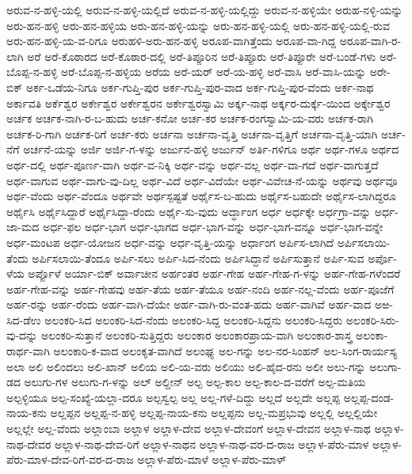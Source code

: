 ಅರುವ-ನ-ಹಳ್ಳಿ-ಯಲ್ಲಿ
ಅರುವ-ನ-ಹಳ್ಳಿ-ಯಲ್ಲಿದೆ
ಅರುವ-ನ-ಹಳ್ಳಿ-ಯಲ್ಲಿದ್ದು
ಅರುವ-ನ-ಹಳ್ಳಿಯೇ
ಅರುಹ-ನಳ್ಳಿ-ಯನ್ನು
ಅರು-ಹನ-ಹಳ್ಳಿ
ಅರು-ಹನ-ಹಳ್ಳಿಯ
ಅರು-ಹನ-ಹಳ್ಳಿ-ಯನ್ನು
ಅರು-ಹನ-ಹಳ್ಳಿ-ಯಲ್ಲಿ
ಅರು-ಹನ-ಹಳ್ಳಿ-ಯಲ್ಲಿ-ರುವ
ಅರು-ಹನ-ಹಳ್ಳಿ-ಯ-ವ-ರಿಗೂ
ಅರುಹಳಿ-ಅರು-ಹನ-ಹಳ್ಳಿ
ಅರೂಪ-ವಾಗಿತ್ತೆಂದು
ಅರೂಪ-ವಾ-ಗಿದ್ದ
ಅರೂಪ-ವಾಗಿ-ರ-ಲಾಗಿ
ಅರೆ
ಅರೆ-ಕೊಠಾರದ
ಅರೆ-ಕೊಠಾರ-ದಲ್ಲಿ
ಅರೆ-ತಿಪ್ಪೂರಿನ
ಅರೆ-ತಿಪ್ಪೂರು
ಅರೆ-ತಿಪ್ಪೂರೇ
ಅರೆ-ಬಂಡೆ-ಗಳು
ಅರೆ-ಬೊಪ್ಪ-ನ-ಹಳ್ಳಿ
ಅರೆ-ಬೊಪ್ಪ-ನ-ಹಳ್ಳಿಯ
ಅರೆಯ
ಅರೆ-ಯರ್
ಅರೆ-ಯ-ಹಳ್ಳಿ
ಅರೆ-ವಾಸಿ
ಅರೆ-ವಾಸಿ-ಯನ್ನು
ಅರೇ-ಬಿಕ್
ಅರ್ಕ-ಒಡೆಯ-ನಿಗೂ
ಅರ್ಕ-ಗುಪ್ತಿ-ಪುರ
ಅರ್ಕ-ಗುಪ್ತಿ-ಪುರ-ವಾದ
ಅರ್ಕ-ಗುಪ್ತಿ-ಪುರ-ವೆಂದು
ಅರ್ಕ-ನಾಥ
ಅರ್ಕಾವತಿ
ಅರ್ಕೆಶ್ವರ
ಅರ್ಕೇಶ್ವರ
ಅರ್ಕೇಶ್ವರನ
ಅರ್ಕೇಶ್ವರಸ್ವಾಮಿ
ಅರ್ಕ್ಕ-ನಾಥ
ಅರ್ಕ್ಕರ-ದುರ್ಕ್ಕೆ-ಯಿಂದ
ಅರ್ಕ್ಕೇಶ್ವರ
ಅರ್ಚಕ
ಅರ್ಚಕ-ನಾಗಿ-ರ-ಬ-ಹುದು
ಅರ್ಚ-ಕನೋ
ಅರ್ಚ-ಕರ
ಅರ್ಚಕ-ರಂಗಸ್ವಾಮಿ-ಯ-ವರು
ಅರ್ಚಕ-ರಾಗಿ
ಅರ್ಚಕ-ರಿ-ಗಾಗಿ
ಅರ್ಚಕ-ರಿಗೆ
ಅರ್ಚ-ಕರು
ಅರ್ಚನಾ
ಅರ್ಚನಾ-ವೃತ್ತಿ
ಅರ್ಚನಾ-ವೃತ್ತಿಗೆ
ಅರ್ಚನಾ-ವೃತ್ತಿ-ಯಾಗಿ
ಅರ್ಚ-ನೆಗೆ
ಅರ್ಚನೆ-ಯನ್ನು
ಅರ್ಜಿ
ಅರ್ಜಿ-ಗ-ಳನ್ನು
ಅರ್ಜುನ-ಹಳ್ಳಿ
ಅರ್ಜುನ್
ಅರ್ತಿ-ಗಳಿಗೂ
ಅರ್ಥ
ಅರ್ಥ-ಗಳೂ
ಅರ್ಥದ
ಅರ್ಥ-ದಲ್ಲಿ
ಅರ್ಥ-ಪೂರ್ಣ-ವಾಗಿ
ಅರ್ಥ-ವ-ನಿಕ್ಕಿ
ಅರ್ಥ-ವನ್ನು
ಅರ್ಥ-ವಲ್ಲ
ಅರ್ಥ-ವಾ-ಗದೆ
ಅರ್ಥ-ವಾಗುತ್ತದೆ
ಅರ್ಥ-ವಾಗುವ
ಅರ್ಥ-ವಾಗು-ವು-ದಿಲ್ಲ
ಅರ್ಥ-ವಿದೆ
ಅರ್ಥ-ವಿದೆಯೇ
ಅರ್ಥ-ವಿವೇಚ-ನೆ-ಯನ್ನು
ಅರ್ಥವು
ಅರ್ಥವೂ
ಅರ್ಥ-ವೆಂದು
ಅರ್ಥ-ವೆಂದೂ
ಅರ್ಥವೇ
ಅರ್ಥಸ್ಪಷ್ಟತೆ
ಅರ್ಥೈಸ-ಬ-ಹುದು
ಅರ್ಥೈಸ-ಬಹುದೇ
ಅರ್ಥೈಸ-ಲಾಗಿದ್ದರೂ
ಅರ್ಥೈಸಿ
ಅರ್ಥೈಸಿದ್ದಾರೆ
ಅರ್ಥೈಸಿದ್ದಾ-ರೆಂದು
ಅರ್ಥೈ-ಸು-ವುದು
ಅರ್ದ್ಧಾಂಗ
ಅರ್ಧ
ಅರ್ಧಕ್ಕೇ
ಅರ್ಧಗ್ರಾ-ವನ್ನು
ಅರ್ಧ-ಜಾ-ಮದ
ಅರ್ಧ-ಫಲ
ಅರ್ಧ-ಭಾಗ
ಅರ್ಧ-ಭಾಗದ
ಅರ್ಧ-ಭಾಗ-ವನ್ನು
ಅರ್ಧ-ಭಾಗ-ವನ್ನೂ
ಅರ್ಧ-ಭಾಗ-ವನ್ನೇ
ಅರ್ಧ-ಮಂಟಪ
ಅರ್ಧ-ಯೋಜನ
ಅರ್ಧ-ವನ್ನು
ಅರ್ಧ-ವೃತ್ತಿ-ಯನ್ನು
ಅರ್ಧಾಂಗ
ಅರ್ಪಿಸ-ಲಾಗಿದೆ
ಅರ್ಪಿಸಲಾಯಿ-ತೆಂದು
ಅರ್ಪಿಸಲಾಯಿ-ತೆಂದೂ
ಅರ್ಪಿ-ಸಲು
ಅರ್ಪಿ-ಸಿದ-ನೆಂದು
ಅರ್ಪಿಸಿದ್ದಾನೆ
ಅರ್ಪಿಸುತ್ತಾನೆ
ಅರ್ಪಿ-ಸುವ
ಅರ್ಪೊ-ಳೆಯ
ಅರ್ಪ್ಪೊಳೆ
ಅರ್ಯಾ-ಬಿಕ್
ಅರ್ವಾಚೀನ
ಅರ್ಹಂತರ
ಅರ್ಹ-ಗೇಹ
ಅರ್ಹ-ಗೇಹ-ಗ-ಳನ್ನು
ಅರ್ಹ-ಗೇಹ-ಗಳೆಂದರೆ
ಅರ್ಹ-ಗೇಹ-ವನ್ನು
ಅರ್ಹ-ಗೇಹವು
ಅರ್ಹ-ತೆಯ
ಅರ್ಹ-ತೆಯೂ
ಅರ್ಹ-ನಂದಿ
ಅರ್ಹ-ನಲ್ಲ-ವೆಂದು
ಅರ್ಹ-ಪೂಜೆಗೆ
ಅರ್ಹ-ರನ್ನು
ಅರ್ಹ-ರೆಂದು
ಅರ್ಹ-ವಾಗಿ-ದೆಯೇ
ಅರ್ಹ-ವಾಗಿ-ರು-ವಂತ-ಹದು
ಅರ್ಹ-ವಾಗಿವೆ
ಅರ್ಹ-ವಾದ
ಅಱ-ಸಿದ-ಡೆಉ
ಅಲಂಕರಿ-ಸಿದ
ಅಲಂಕರಿ-ಸಿದ-ನೆಂದು
ಅಲಂಕರಿ-ಸಿದ್ದ
ಅಲಂಕರಿ-ಸಿದ್ದನು
ಅಲಂಕರಿ-ಸಿದ್ದರು
ಅಲಂಕರಿ-ಸಿರು-ವು-ದನ್ನು
ಅಲಂಕರಿ-ಸುತ್ತಾನೆ
ಅಲಂಕರಿ-ಸುತ್ತಿದ್ದರು
ಅಲಂಕಾರ
ಅಲಂಕಾರಪ್ರಾಯ-ವಾಗಿ
ಅಲಂಕಾರ-ಶಾಸ್ತ್ರ
ಅಲಂಕಾ-ರಾರ್ಥ-ವಾಗಿ
ಅಲಂಕಾರಿ-ಕ-ವಾದ
ಅಲಂಕೃತ-ವಾಗಿದೆ
ಅಲಂಘ್ಯ
ಅಲ-ಗನ್ನು
ಅಲ-ನರ-ಸಿಂಹನ್
ಅಲ-ಸಿಂಗ-ರಾರ್ಯಸ್ಯ
ಅಲಾ
ಅಲಿ
ಅಲಿಂದಲು
ಅಲಿ-ಖಾನ್
ಅಲಿಯ
ಅಲಿ-ಯ-ವರು
ಅಲಿಯು
ಅಲಿ-ಹೈದ-ರನು
ಅಲೀ
ಅಲು-ಗನ್ನು
ಅಲುಗಾ-ಡದ
ಅಲುಗು-ಗಳ
ಅಲುಗು-ಗ-ಳನ್ನು
ಅಲ್
ಅಲ್ದೀನ್
ಅಲ್ಪ
ಅಲ್ಪ-ಕಾಲ
ಅಲ್ಪ-ಕಾಲ-ದ-ವರೆಗೆ
ಅಲ್ಪ-ಮತಿಯ
ಅಲ್ಪಳ್ಳಿಯೂ
ಅಲ್ಪ-ಸಂಖ್ಯೆ-ಯಲ್ಲಾ-ದರೂ
ಅಲ್ಪಸ್ವಲ್ಪ
ಅಲ್ಲ
ಅಲ್ಲ-ಗಳೆ-ದಿದ್ದು
ಅಲ್ಲದೆ
ಅಲ್ಲದೇ
ಅಲ್ಲಪ್ಪ
ಅಲ್ಲಪ್ಪ-ದಂಡ-ನಾಯ-ಕನು
ಅಲ್ಲಪ್ಪನ
ಅಲ್ಲಪ್ಪ-ನ-ಹಳ್ಳಿ
ಅಲ್ಲಪ್ಪ-ನಾಯ-ಕನು
ಅಲ್ಲಪ್ಪನು
ಅಲ್ಲ-ಮಪ್ರಭುವು
ಅಲ್ಲಲ್ಲಿ
ಅಲ್ಲಲ್ಲಿಯೇ
ಅಲ್ಲಲ್ಲೇ
ಅಲ್ಲ-ವೆಂದು
ಅಲ್ಲಾಂಬಾ
ಅಲ್ಲಾಳ
ಅಲ್ಲಾಳ-ದೇವ
ಅಲ್ಲಾಳ-ದೇವಂಗೆ
ಅಲ್ಲಾಳ-ದೇವನ
ಅಲ್ಲಾಳ-ನಾಥ
ಅಲ್ಲಾಳ-ನಾಥ-ದೇವರ
ಅಲ್ಲಾಳ-ನಾಥ-ದೇವ-ರಿಗೆ
ಅಲ್ಲಾಳ-ನಾಥನ
ಅಲ್ಲಾಳ-ನಾಥ-ವರ-ದ-ರಾಜ
ಅಲ್ಲಾಳ-ಪೆರು-ಮಾಳ
ಅಲ್ಲಾಳ-ಪೆರು-ಮಾಳ-ದೇವ-ರಿಗೆ-ವರ-ದ-ರಾಜ
ಅಲ್ಲಾಳ-ಪೆರು-ಮಾಳೆ
ಅಲ್ಲಾಳ-ಪೆರು-ಮಾಳ್
